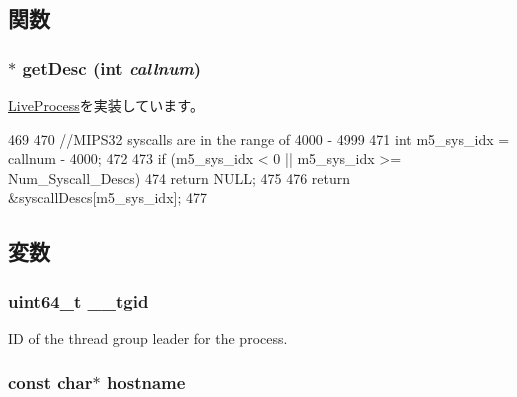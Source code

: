 \subsection{関数}
\hypertarget{classMipsLinuxProcess_aebbff609a7235342925445690acf5ee8}{
\subsubsection[{getDesc}]{ $\ast$ getDesc (int {\em callnum})}}
\label{classMipsLinuxProcess_aebbff609a7235342925445690acf5ee8}


\hyperlink{classLiveProcess_a478f396f8895ef7728d26866a00121d7}{LiveProcess}を実装しています。


\begin{DoxyCode}
469 {
470     //MIPS32 syscalls are in the range of 4000 - 4999
471     int m5_sys_idx = callnum - 4000;
472 
473     if (m5_sys_idx < 0 || m5_sys_idx >= Num_Syscall_Descs)
474         return NULL;
475 
476     return &syscallDescs[m5_sys_idx];
477 }
\end{DoxyCode}


\subsection{変数}
\hypertarget{classMipsLinuxProcess_a8ac0d1d5ebb59917141aa3e5293f6dfd}{
\subsubsection[{\_\-\_\-tgid}]{\setlength{\rightskip}{0pt plus 5cm}uint64\_\-t {\bf \_\-\_\-tgid}}}
\label{classMipsLinuxProcess_a8ac0d1d5ebb59917141aa3e5293f6dfd}


ID of the thread group leader for the process. \hypertarget{classMipsLinuxProcess_aad01339e89106fdf68f57ef118956fa9}{
\subsubsection[{hostname}]{\setlength{\rightskip}{0pt plus 5cm}const char$\ast$ {\bf hostname}}}
\label{classMipsLinuxProcess_aad01339e89106fdf68f57ef118956fa9}


